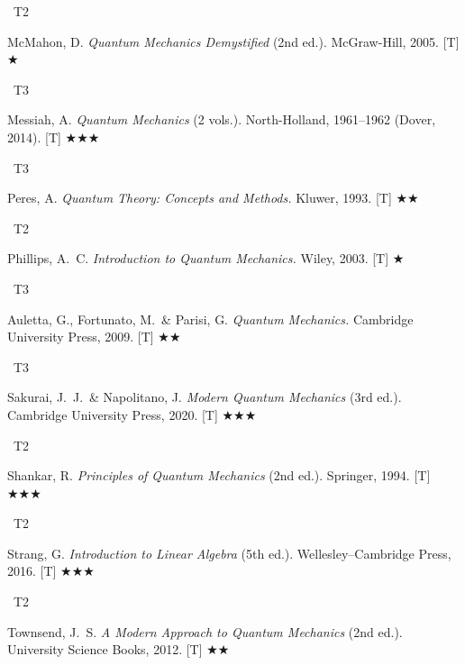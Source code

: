 \documentclass[11pt,a4paper]{article}
\newcommand{\tierbadge}[2]{\colorbox{#1}{\small\bfseries\color{white}\strut\ #2\ }}
\newcommand{\essential}{$\bigstar\bigstar\bigstar$}
\newcommand{\recommended}{$\bigstar\bigstar$}
\newcommand{\useful}{$\bigstar$}
\begin{document}
\begin{tcolorbox}[catbox]
\begin{enumerate}[leftmargin=2.5em,label=\textbf{[B\arabic*]},itemsep=3pt]
  \item \tierbadge{t2blue}{T2} McMahon, D. \textit{Quantum Mechanics Demystified} (2nd ed.). McGraw-Hill, 2005. [T] \useful
  \item \tierbadge{t3purple}{T3} Messiah, A. \textit{Quantum Mechanics} (2 vols.). North-Holland, 1961--1962 (Dover, 2014). [T] \essential
  \item \tierbadge{t3purple}{T3} Peres, A. \textit{Quantum Theory: Concepts and Methods.} Kluwer, 1993. [T] \recommended
  \item \tierbadge{t2blue}{T2} Phillips, A.~C. \textit{Introduction to Quantum Mechanics.} Wiley, 2003. [T] \useful
  \item \tierbadge{t3purple}{T3} Auletta, G., Fortunato, M.\ \& Parisi, G. \textit{Quantum Mechanics.} Cambridge University Press, 2009. [T] \recommended
  \item \tierbadge{t3purple}{T3} Sakurai, J.~J.\ \& Napolitano, J. \textit{Modern Quantum Mechanics} (3rd ed.). Cambridge University Press, 2020. [T] \essential
  \item \tierbadge{t2blue}{T2} Shankar, R. \textit{Principles of Quantum Mechanics} (2nd ed.). Springer, 1994. [T] \essential
  \item \tierbadge{t2blue}{T2} Strang, G. \textit{Introduction to Linear Algebra} (5th ed.). Wellesley--Cambridge Press, 2016. [T] \essential
  \item \tierbadge{t2blue}{T2} Townsend, J.~S. \textit{A Modern Approach to Quantum Mechanics} (2nd ed.). University Science Books, 2012. [T] \recommended
\end{enumerate}
\end{tcolorbox}

\end{document}
